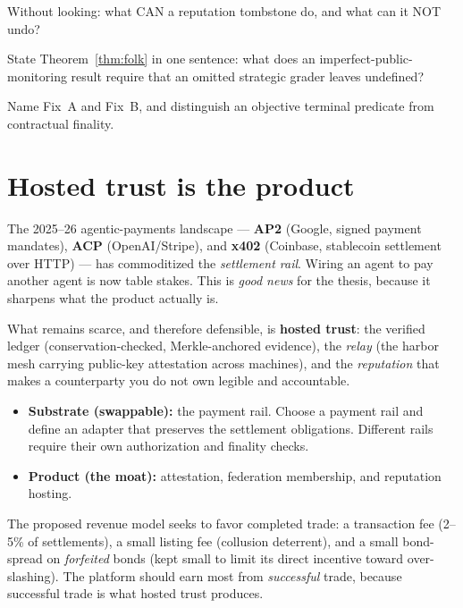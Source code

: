 \documentclass[11pt,a4paper]{article}
\theoremstyle{definition}
\theoremstyle{definition}
\theoremstyle{remark}
\begin{document}
\pdexercisepointer*{\ref{ex:he-folk-signal-assumption}}{\ref{ex:he-rate-the-raters}}{\pageref{ex:he-folk-signal-assumption}}

\begin{pdrecitation}
\item Without looking: what CAN a reputation tombstone do, and what can it NOT undo?
\item State Theorem~\ref{thm:folk} in one sentence: what does an imperfect-public-monitoring result require that an omitted strategic grader leaves undefined?
\item Name Fix~A and Fix~B, and distinguish an objective terminal predicate from contractual finality.
\end{pdrecitation}

\section{Hosted trust is the product}\label{sec:hosted-trust}

The 2025--26 agentic-payments landscape --- \textbf{AP2} (Google, signed payment
mandates), \textbf{ACP} (OpenAI/Stripe), and \textbf{x402} (Coinbase, stablecoin
settlement over HTTP) --- has commoditized the \emph{settlement rail}. Wiring an
agent to pay another agent is now table stakes. This is \emph{good news} for the
thesis, because it sharpens what the product actually is.

What remains scarce, and therefore defensible, is \textbf{hosted trust}: the
verified ledger (conservation-checked, Merkle-anchored evidence), the \emph{relay}
(the harbor mesh carrying public-key attestation across machines), and the
\emph{reputation} that makes a counterparty you do not own legible and accountable.

\begin{itemize}[leftmargin=1.4em,itemsep=2pt]
  \item \textbf{Substrate (swappable):} the payment rail. Choose a payment rail and
    define an adapter that preserves the settlement obligations. Different
    rails require their own authorization and finality checks.
  \item \textbf{Product (the moat):} attestation, federation membership, and
    reputation hosting.
\end{itemize}

The proposed revenue model seeks to favor completed trade: a transaction
fee (2--5\% of settlements), a small listing fee (collusion deterrent), and a small
bond-spread on \emph{forfeited} bonds (kept small to limit its direct incentive toward
over-slashing). The platform should earn most from \emph{successful} trade, because
successful trade is what hosted trust produces.
\end{document}
